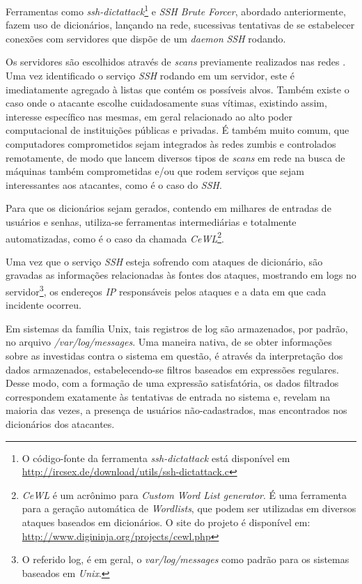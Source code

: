 Ferramentas como \textit{ssh-dictattack}\footnote{O código-fonte da ferramenta \textit{ssh-dictattack} está disponível em \url{http://ircsex.de/download/utils/ssh-dictattack.c}} e \textit{SSH Brute Forcer}, abordado anteriormente, fazem uso de dicionários, lançando na rede, sucessivas tentativas de se estabelecer conexões com servidores que dispõe de um \textit{daemon} \textit{SSH} rodando.

Os servidores são escolhidos através de \textit{scans} previamente realizados nas redes \cite{NetworkBasedDictionaryAttackDetection}. Uma vez identificado o serviço \textit{SSH} rodando em um servidor, este é imediatamente agregado à listas que contém os possíveis alvos. Também existe o caso onde o atacante escolhe cuidadosamente suas vítimas, existindo assim, interesse específico nas mesmas, em geral relacionado ao alto poder computacional de instituições públicas e privadas. É também muito comum, que computadores comprometidos sejam integrados às redes zumbis e controlados remotamente, de modo que lancem diversos tipos de \textit{scans} em rede na busca de máquinas também comprometidas e/ou que rodem serviços que sejam interessantes aos atacantes, como é o caso do \textit{SSH}.

Para que os dicionários sejam gerados, contendo em milhares de entradas de usuários e senhas, utiliza-se ferramentas intermediárias e totalmente automatizadas, como é o caso da chamada \textit{CeWL}\footnote{\textit{CeWL} é um acrônimo para \textit{Custom Word List generator}. É uma ferramenta para a geração automática de \textit{Wordlists}, que podem ser utilizadas em diversos ataques baseados em dicionários. O site do projeto é disponível em: \url{http://www.digininja.org/projects/cewl.php}}.

Uma vez que o serviço \textit{SSH} esteja sofrendo com ataques de dicionário, são gravadas as informações relacionadas às fontes dos ataques, mostrando em logs no servidor\footnote{O referido log, é em geral, o \textit{var/log/messages} como padrão para os sistemas baseados em \textit{Unix}.}, os endereços \textit{IP} responsáveis pelos ataques e a data em que cada incidente ocorreu.

Em sistemas da família Unix, tais registros de log são armazenados, por padrão, no arquivo \textit{/var/log/messages}. Uma maneira nativa, de se obter informações sobre as investidas contra o sistema em questão, é através da interpretação dos dados armazenados, estabelecendo-se filtros baseados em expressões regulares. Desse modo, com a formação de uma expressão satisfatória, os dados filtrados correspondem exatamente às tentativas de entrada no sistema e, revelam na maioria das vezes, a presença de usuários não-cadastrados, mas encontrados nos dicionários dos atacantes.

